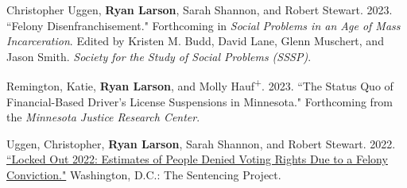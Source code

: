 \documentclass[letterpaper]{article}
\renewenvironment{itemize}{
  \begin{list}{}{
    \setlength{\leftmargin}{1.5em}
  }
}{
  \end{list}
}
\begin{document}
\begin{itemize}

\item Christopher Uggen, \textbf{Ryan Larson}, Sarah Shannon, and Robert Stewart. 2023. ``Felony Disenfranchisement." Forthcoming in \textit{Social Problems in an Age of Mass Incarceration}. Edited by Kristen M. Budd, David Lane, Glenn Muschert, and Jason Smith. \textit{Society for the Study of Social Problems (SSSP)}.

\item Remington, Katie, \textbf{Ryan Larson}, and Molly Hauf\textsuperscript{+}. 2023. ``The Status Quo of Financial-Based Driver's License Suspensions in Minnesota." Forthcoming from the \textit{Minnesota Justice Research Center}.
\item Uggen, Christopher, \textbf{Ryan Larson}, Sarah Shannon, and Robert Stewart.  2022. \href{}{``Locked Out 2022: Estimates of People Denied Voting Rights Due to a Felony Conviction."} Washington, D.C.: The Sentencing Project.
\begin{itemize}

\end{itemize}
\end{itemize}
\end{document}
